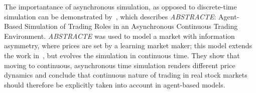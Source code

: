 The importantance of asynchronous simulation, as opposed to discrete-time simulation can be demonstrated by~\citet{Sorban2008}, which describes \textit{ABSTRACTE}: Agent-Based Simulation of Trading Roles in an Asynchronous Continuous Trading Environment. \textit{ABSTRACTE} was used to model a market with information asymmetry, where prices are set by a learning market maker; this model extends the work in~\citep{Das2006}, but evolves the simulation in continuous time. They show that moving to continuous, asynchronous time simulation renders different price dynamics and conclude that continuous nature of trading in real stock markets should therefore be explicitly taken into account in agent-based models.







